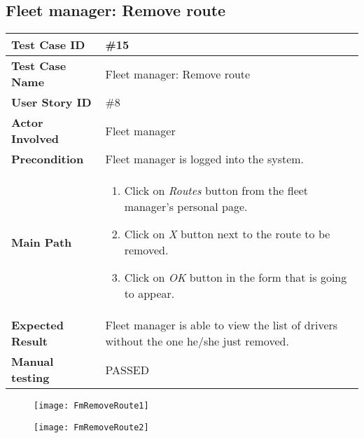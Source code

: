 \subsection{Fleet manager: Remove route}
\begin{center}
	\begin{tabular} { | m{3.5cm} | m{9.5cm} | }
		\hline
		\textbf{Test Case ID} & \#15\\
		\hline
		\textbf{Test Case Name} & Fleet manager: Remove route\\
		\hline
		\textbf{User Story ID} & \#8 \\
		\hline
		\textbf{Actor Involved} & Fleet manager\\
		\hline
		\textbf{Precondition} & Fleet manager is logged into the system.\\
		\hline
		\textbf{Main Path} & 
		\begin{enumerate}
			\item Click on \textit{Routes} button from the fleet manager's personal page.
			\item Click on \textit{X} button next to the route to be removed.
			\item Click on \textit{OK} button in the form that is going to appear.
		\end{enumerate}\\
		\hline
		\textbf{Expected Result} & Fleet manager is able to view the list of drivers without the one he/she just removed.\\
		\hline
	\textbf{Manual testing} & PASSED\\
	\hline
\end{tabular}
\end{center}
\begin{figure}[H]
\centering
\texttt{[image: FmRemoveRoute1]}
\end{figure}
\begin{figure}[H]
\centering
\texttt{[image: FmRemoveRoute2]}
\end{figure}
\newpage
